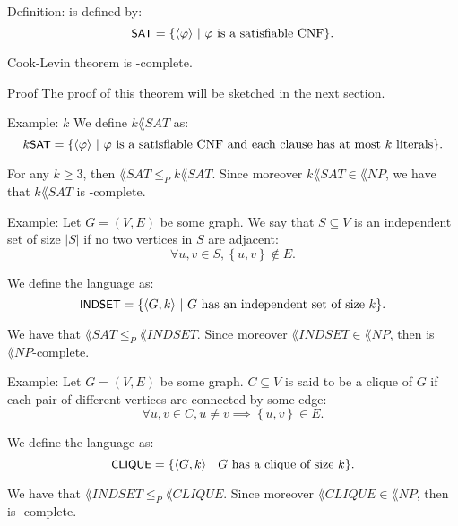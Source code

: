 \documentclass[a4paper]{article}
\begin{document}
\begin{parag}{Definition: }
     is defined by: 
    \[\lang{SAT} = \left\{\left\langle \phi \right\rangle \suchthat \text{$\phi$ is a satisfiable CNF}\right\}.\]
\end{parag}

\begin{parag}{Cook-Levin theorem}
     is -complete.

    \begin{subparag}{Proof}
        The proof of this theorem will be sketched in the next section.
    \end{subparag}
\end{parag}

\begin{parag}{Example: $k$}
    We define $k\lang{SAT}$ as: 
    \[k\lang{SAT} = \left\{\left\langle \phi \right\rangle \suchthat \text{$\phi$ is a satisfiable CNF and each clause has at most $k$ literals}\right\}.\]

    For any $k \geq 3$, then $\lang{SAT} \leq_P k\lang{SAT}$. Since moreover $k\lang{SAT} \in \lang{NP}$, we have that $k\lang{SAT}$ is -complete.
\end{parag}

\begin{parag}{Example: }
    Let $G = \left(V, E\right)$ be some graph. We say that $S \subseteq V$ is an independent set of size $\left|S\right|$ if no two vertices in $S$ are adjacent: 
    \[\forall u,v \in S, \left\{u ,v\right\} \not\in E.\]

    We define the language  as:
    \[\lang{INDSET} = \left\{\left\langle G, k \right\rangle \suchthat \text{$G$ has an independent set of size $k$}\right\}.\]

    We have that $\lang{SAT} \leq_P \lang{INDSET}$. Since moreover $\lang{INDSET} \in \lang{NP}$, then  is $\lang{NP}$-complete.
\end{parag}

\begin{parag}{Example: }
    Let $G = \left(V, E\right)$ be some graph. $C \subseteq V$ is said to be a clique of $G$ if each pair of different vertices are connected by some edge: 
    \[\forall u, v \in C, u \neq v \implies \left\{u, v\right\} \in E.\]

    We define the language  as: 
    \[\lang{CLIQUE} = \left\{\left\langle G, k \right\rangle \suchthat \text{$G$ has a clique of size $k$}\right\}.\]

    We have that $\lang{INDSET} \leq_P \lang{CLIQUE}$. Since moreover $\lang{CLIQUE} \in \lang{NP}$, then  is -complete.
\end{parag}
\end{document}
